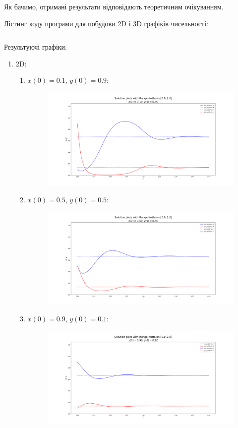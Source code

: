 Як бачимо, отримані результати відповідають теоретичним очікуванням. \medskip

Лістинг коду програми для побудови 2D і 3D графіків чисельності:
\inputminted{python}{py/plots_2.py}

Результуючі графіки:
\begin{enumerate}
	\item 2D:
	\begin{enumerate}
		\item $x(0) = 0.1$, $y(0) = 0.9$:
		\begin{figure}
			\centering
			\includegraphics[width=\textwidth]{plot_2d_0.10_0.90_2.png}
		\end{figure}
		\item $x(0) = 0.5$, $y(0) = 0.5$:
		\begin{figure}
			\centering
			\includegraphics[width=\textwidth]{plot_2d_0.50_0.50_2.png}
		\end{figure}
		\item $x(0) = 0.9$, $y(0) = 0.1$:
		\begin{figure}
			\centering
			\includegraphics[width=\textwidth]{plot_2d_0.90_0.10_2.png}

\end{figure}
\end{enumerate}
\end{enumerate}
